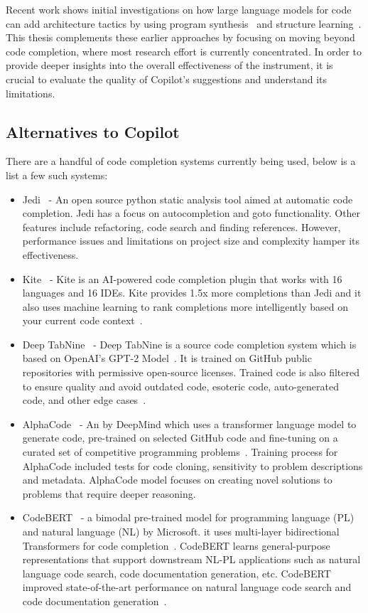 Recent work shows initial investigations on how large language models for code can add architecture tactics by using program synthesis~\cite{Shokri2021, jigsaw} and structure learning~\cite{Karmakar2021}.
This thesis complements these earlier approaches by focusing on moving beyond code completion, where most research effort is currently concentrated.
In order to provide deeper insights into the overall effectiveness of the instrument, it is crucial to evaluate the quality of Copilot's suggestions and understand its limitations.

\subsection{Alternatives to Copilot}
There are a handful of code completion systems currently being used, below is a list a few such systems:

\begin{itemize}
    \item Jedi~\cite{jedi} - An open source python static analysis tool aimed at automatic code completion. Jedi has a focus on autocompletion and goto functionality. Other features include refactoring, code search and finding references. However, performance issues and limitations on project size and complexity hamper its effectiveness.
    \item Kite~\cite{kite} - Kite is an AI-powered code completion plugin that works with 16 languages and 16 IDEs. Kite provides 1.5x more completions than Jedi and it also uses machine learning to rank completions more intelligently based on your current code context~\cite{kite}.
    \item Deep TabNine~\cite{tabnine} - Deep TabNine is a source code completion system which is based on OpenAI's GPT-2 Model~\cite{gpt2}. It is trained on GitHub public repositories with permissive open-source licenses. Trained code is also filtered to ensure quality and avoid outdated code, esoteric code, auto-generated code, and other edge cases~\cite{tabnine}.
    \item AlphaCode~\cite{alphacode} - An \cct{} by DeepMind which uses a transformer language model to generate code, pre-trained on selected GitHub code and fine-tuning on a curated set of competitive programming problems~\cite{alphacode}. Training process for AlphaCode included tests for code cloning, sensitivity to problem descriptions and metadata. AlphaCode model focuses on creating novel solutions to problems that require deeper reasoning. 
    \item CodeBERT~\cite{codebert} - a bimodal pre-trained model for programming language (PL) and natural language (NL) by Microsoft. it uses multi-layer bidirectional Transformers for code completion~\cite{codebert}. CodeBERT learns general-purpose representations that support downstream NL-PL applications such as natural language code search, code documentation generation, etc. CodeBERT improved state-of-the-art performance on natural language code search and code documentation generation~\cite{codebert}.
\end{itemize}
